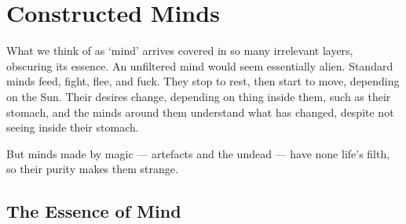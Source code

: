 \chapter{Constructed Minds}

What we think of as `mind' arrives covered in so many irrelevant layers, obscuring its essence.
An unfiltered mind would seem essentially alien.
Standard minds feed, fight, flee, and fuck.
They stop to rest, then start to move, depending on the Sun.
Their desires change, depending on thing inside them, such as their stomach, and the minds around them understand what has changed, despite not seeing inside their stomach.

But minds made by magic --- \glspl{artefact} and the undead --- have none life's filth, so their purity makes them strange.

\section{The Essence of Mind}

